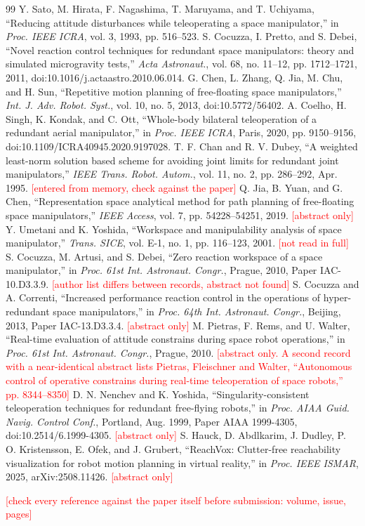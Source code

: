 \documentclass[pdflatex,sn-mathphys-num]{sn-jnl}
\newcommand{\todo}[1]{\textcolor{red}{[#1]}}
\begin{document}
\begin{thebibliography}{99}
 Y. Sato, M. Hirata, F. Nagashima, T. Maruyama, and T. Uchiyama, ``Reducing attitude disturbances while teleoperating a space manipulator,'' in \emph{Proc. IEEE ICRA}, vol. 3, 1993, pp. 516--523.
 S. Cocuzza, I. Pretto, and S. Debei, ``Novel reaction control techniques for redundant space manipulators: theory and simulated microgravity tests,'' \emph{Acta Astronaut.}, vol. 68, no. 11--12, pp. 1712--1721, 2011, doi:10.1016/j.actaastro.2010.06.014.
 G. Chen, L. Zhang, Q. Jia, M. Chu, and H. Sun, ``Repetitive motion planning of free-floating space manipulators,'' \emph{Int. J. Adv. Robot. Syst.}, vol. 10, no. 5, 2013, doi:10.5772/56402.
 A. Coelho, H. Singh, K. Kondak, and C. Ott, ``Whole-body bilateral teleoperation of a redundant aerial manipulator,'' in \emph{Proc. IEEE ICRA}, Paris, 2020, pp. 9150--9156, doi:10.1109/ICRA40945.2020.9197028.
 T. F. Chan and R. V. Dubey, ``A weighted least-norm solution based scheme for avoiding joint limits for redundant joint manipulators,'' \emph{IEEE Trans. Robot. Autom.}, vol. 11, no. 2, pp. 286--292, Apr. 1995. \todo{entered from memory, check against the paper}
 Q. Jia, B. Yuan, and G. Chen, ``Representation space analytical method for path planning of free-floating space manipulators,'' \emph{IEEE Access}, vol. 7, pp. 54228--54251, 2019. \todo{abstract only}
 Y. Umetani and K. Yoshida, ``Workspace and manipulability analysis of space manipulator,'' \emph{Trans. SICE}, vol. E-1, no. 1, pp. 116--123, 2001. \todo{not read in full}
 S. Cocuzza, M. Artusi, and S. Debei, ``Zero reaction workspace of a space manipulator,'' in \emph{Proc. 61st Int. Astronaut. Congr.}, Prague, 2010, Paper IAC-10.D3.3.9. \todo{author list differs between records, abstract not found}
 S. Cocuzza and A. Correnti, ``Increased performance reaction control in the operations of hyper-redundant space manipulators,'' in \emph{Proc. 64th Int. Astronaut. Congr.}, Beijing, 2013, Paper IAC-13.D3.3.4. \todo{abstract only}
 M. Pietras, F. Rems, and U. Walter, ``Real-time evaluation of attitude constrains during space robot operations,'' in \emph{Proc. 61st Int. Astronaut. Congr.}, Prague, 2010. \todo{abstract only. A second record with a near-identical abstract lists Pietras, Fleischner and Walter, ``Autonomous control of operative constrains during real-time teleoperation of space robots,'' pp. 8344--8350}
 D. N. Nenchev and K. Yoshida, ``Singularity-consistent teleoperation techniques for redundant free-flying robots,'' in \emph{Proc. AIAA Guid. Navig. Control Conf.}, Portland, Aug. 1999, Paper AIAA 1999-4305, doi:10.2514/6.1999-4305. \todo{abstract only}
 S. Hauck, D. Abdlkarim, J. Dudley, P. O. Kristensson, E. Ofek, and J. Grubert, ``ReachVox: Clutter-free reachability visualization for robot motion planning in virtual reality,'' in \emph{Proc. IEEE ISMAR}, 2025, arXiv:2508.11426. \todo{abstract only}
\end{thebibliography}
\todo{check every reference against the paper itself before submission: volume, issue, pages}
\end{document}
